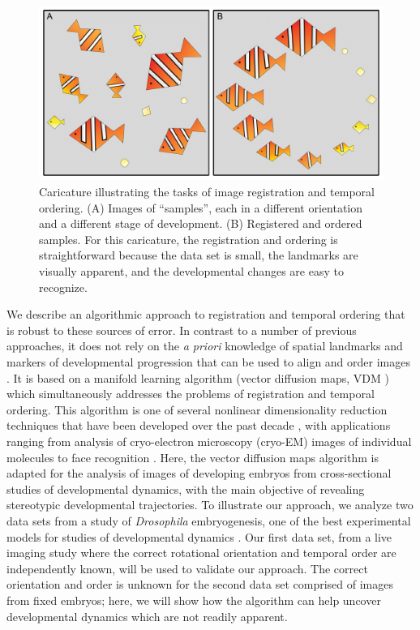\documentclass{pnastwo}
\makeatletter
\newcommand{\customlabel}[2]{%
\protected@write \@auxout {}{\string \newlabel {#1}{{#2}{}}}}
\makeatother
\begin{document}
\begin{article}
\begin{figure}[t]
\includegraphics{fig1}
\caption{Caricature illustrating the tasks of image registration and temporal ordering. {\xfigtextfontit (A)} Images of ``samples'', each in a different orientation and a different stage of development. {\xfigtextfontit (B)} Registered and ordered samples. For this caricature, the registration and ordering is straightforward because the data set is small, the landmarks are visually apparent, and the developmental changes are easy to recognize.}
\customlabel{fig:fish}{1}
\customlabel{subfig:fish_unordered}{\ref{fig:fish}{\it A}}
\customlabel{subfig:fish_ordered}{\ref{fig:fish}{\it B}}
\end{figure}


We describe an algorithmic approach to registration and temporal ordering that is robust to these sources of error.
%
In contrast to a number of previous approaches, it does not rely on the {\em a priori} knowledge of spatial landmarks and markers of developmental progression that can be used to align and order images \cite{zitova2003image, rowley1998rotation, hajnal2010medical, greenspan1994rotation, zhao2003face}.
%
It is based on a manifold learning algorithm (vector diffusion maps, VDM \cite{singer2012vector}) which simultaneously addresses the problems of registration and temporal ordering. 
%
This algorithm is one of several nonlinear dimensionality reduction techniques that have been developed over the past decade \cite{Belkin2003, coifman2005geometric, coifman2006geometric, tenenbaum2000global, roweis2000nonlinear}, with
applications ranging from analysis of cryo-electron microscopy (cryo-EM) images of individual molecules  \cite{zhao2014rotationally, singer2011viewing} to face recognition \cite{lafon2006data}.
%
Here, the vector diffusion maps algorithm is adapted for the analysis of images of developing embryos from cross-sectional studies of developmental dynamics, with the main objective of revealing stereotypic developmental trajectories.
%
To illustrate our approach, we analyze two data sets from a study of {\it Drosophila} embryogenesis, one of the best experimental models for studies of developmental dynamics \cite{jaeger2012drosophila}.
%
Our first data set, from a live imaging study where the correct rotational orientation and temporal order are independently known, will be used to validate our approach.
%
The correct orientation and order is unknown for the second data set comprised of images from fixed embryos; here, we will show how the algorithm can help uncover developmental dynamics which are not readily apparent. 



\end{article}
\end{document}
